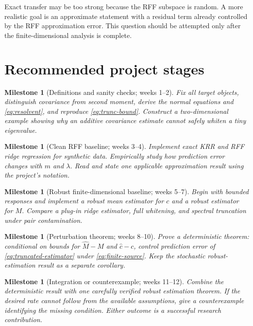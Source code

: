 \documentclass[11pt]{article}
\newtheorem{milestone}[definition]{Milestone}
\begin{document}
Exact transfer may be too strong because the RFF subspace is random.  A more
realistic goal is an approximate statement with a residual term already
controlled by the RFF approximation error.  This question should be attempted
only after the finite-dimensional analysis is complete.

\section{Recommended project stages}

\begin{milestone}[Definitions and sanity checks; weeks 1--2]
Fix all target objects, distinguish covariance from second moment, derive the
normal equations and \eqref{eq:resolvent}, and reproduce
\cref{eq:trunc-bound}.  Construct a two-dimensional example showing why an
additive covariance estimate cannot safely whiten a tiny eigenvalue.
\end{milestone}

\begin{milestone}[Clean RFF baseline; weeks 3--4]
Implement exact KRR and RFF ridge regression for synthetic data.  Empirically
study how prediction error changes with $m$ and $\lambda$.  Read
\cite{rahimi2007,rudi2017,avron2017} and state one applicable approximation
result using the project's notation.
\end{milestone}

\begin{milestone}[Robust finite-dimensional baseline; weeks 5--7]
Begin with bounded responses and implement a robust mean estimator for $c$ and
a robust estimator for $M$.  Compare a plug-in ridge estimator, full whitening,
and spectral truncation under pair contamination.
\end{milestone}

\begin{milestone}[Perturbation theorem; weeks 8--10]
Prove a deterministic theorem: conditional on bounds for $\widehat M-M$ and
$\widehat c-c$, control prediction error of \eqref{eq:truncated-estimator} under
\eqref{eq:finite-source}.  Keep the stochastic robust-estimation result as a
separate corollary.
\end{milestone}

\begin{milestone}[Integration or counterexample; weeks 11--12]
Combine the deterministic result with one carefully verified robust estimation
theorem.  If the desired rate cannot follow from the available assumptions,
give a counterexample identifying the missing condition.  Either outcome is a
successful research contribution.
\end{milestone}
\end{document}
